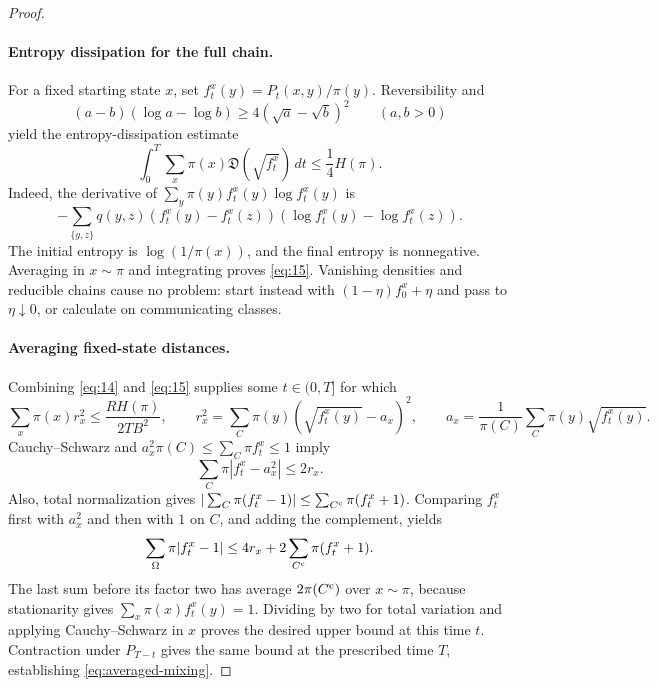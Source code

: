 \begin{proof}
\paragraph{Entropy dissipation for the full chain.}
For a fixed starting state $x$, set $f_t^x(y)=P_t(x,y)/\pi(y)$.
Reversibility and
\[
 (a-b)(\log a-\log b)\ge4(\sqrt a-\sqrt b)^2
 \qquad(a,b>0)
\]
yield the entropy-dissipation estimate
\cite[Lemmas~2.5 and~2.7]{DiaconisSaloffCoste1996}
\begin{equation}\label{eq:15}
 \int_0^T\sum_x\pi(x)\mathfrak D(\sqrt{f_t^x})\,dt
 \le\frac14H(\pi).
\end{equation}
Indeed, the derivative of $\sum_y\pi(y)f_t^x(y)\log f_t^x(y)$ is
\[
 -\sum_{\{y,z\}}q(y,z)
       (f_t^x(y)-f_t^x(z))(\log f_t^x(y)-\log f_t^x(z)).
\]
The initial entropy is $\log(1/\pi(x))$, and the final entropy is
nonnegative. Averaging in $x\sim\pi$ and integrating proves
\eqref{eq:15}. Vanishing densities and reducible chains cause no
problem: start instead with $(1-\eta)f_0^x+\eta$ and pass to
$\eta\downarrow0$, or calculate on communicating classes.

\paragraph{Averaging fixed-state distances.}
Combining \eqref{eq:14} and \eqref{eq:15} supplies some
$t\in(0,T]$ for which
\[
 \sum_x\pi(x)r_x^2\le\frac{R H(\pi)}{2TB^2},
 \qquad r_x^2=\sum_C\pi(y)(\sqrt{f_t^x(y)}-a_x)^2,
 \qquad a_x=\frac1{\pi(C)}\sum_C\pi(y)\sqrt{f_t^x(y)}.
\]
Cauchy--Schwarz and
$a_x^2\pi(C)\le\sum_C\pi f_t^x\le1$ imply
\[
 \sum_C\pi|f_t^x-a_x^2|\le2r_x.
\]
Also, total normalization gives
$|\sum_C\pi(f_t^x-1)|\le\sum_{C^{\rm c}}\pi(f_t^x+1)$.
Comparing $f_t^x$ first with $a_x^2$ and then with $1$ on $C$,
and adding the complement, yields
\[
 \sum_\Omega\pi|f_t^x-1|
 \le4r_x+2\sum_{C^{\rm c}}\pi(f_t^x+1).
\]
The last sum before its factor two has average $2\pi(C^{\rm c})$
over $x\sim\pi$, because stationarity gives
$\sum_x\pi(x)f_t^x(y)=1$. Dividing by two for total variation
and applying Cauchy--Schwarz in $x$ proves the desired upper bound
at this time $t$. Contraction under $P_{T-t}$ gives the same bound
at the prescribed time $T$, establishing \eqref{eq:averaged-mixing}.
\end{proof}

